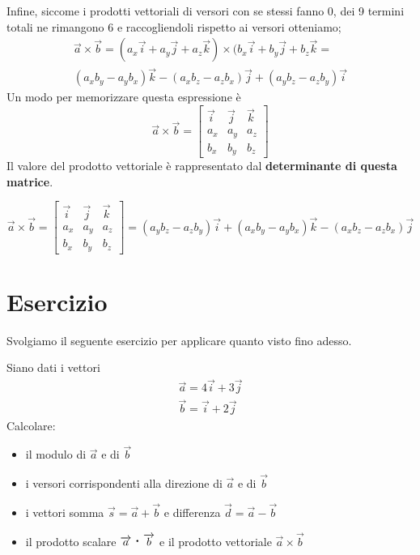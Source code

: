 Infine, siccome i prodotti vettoriali di versori con se stessi fanno 0, dei 9 termini totali ne rimangono 6 e raccogliendoli rispetto ai versori otteniamo;
\begin{align*}
\overrightarrow{a} \times \overrightarrow{b} = ( a_{x} \overrightarrow{i} + a_{y}\overrightarrow{j} + a_{z} \overrightarrow{k}  ) \times ( b_{x} \overrightarrow{i} + b_{y} \overrightarrow{j} + b_{z} \overrightarrow{k} = \\
( a_{x} b_{y} - a_{y} b_{x} ) \overrightarrow{k} - ( a_{x} b_{z} - a_{z} b_{x} ) \overrightarrow{j} + ( a_{y} b_{z} - a_{z} b_{y} ) \overrightarrow{i}
\end{align*}
Un modo per memorizzare questa espressione è
$$ \overrightarrow{a} \times \overrightarrow{b} = \begin{bmatrix}
\overrightarrow{i} & \overrightarrow{j} & \overrightarrow{k} \\
a_{x} & a_{y} & a_{z} \\
b_{x} & b_{y} & b_{z}
\end{bmatrix}  $$
Il valore del prodotto vettoriale è rappresentato dal \textbf{determinante di questa matrice}.

$$ \overrightarrow{a} \times \overrightarrow{b} = \begin{bmatrix}
\overrightarrow{i} & \overrightarrow{j} & \overrightarrow{k} \\
a_{x} & a_{y} & a_{z} \\
b_{x} & b_{y} & b_{z}
\end{bmatrix}  
= ( a_{y} b_{z} - a_{z} b_{y} ) \overrightarrow{i} + ( a_{x} b_{y} - a_{y} b_{x} ) \overrightarrow{k} - ( a_{x} b_{z} - a_{z} b_{x} ) \overrightarrow{j}  $$

\section{Esercizio}
Svolgiamo il seguente esercizio per applicare quanto visto fino adesso.

Siano dati i vettori
\begin{align*}
\overrightarrow{a} = 4 \overrightarrow{i} + 3 \overrightarrow{j} \\
\overrightarrow{b} = \overrightarrow{i} + 2 \overrightarrow{j}
\end{align*}
Calcolare:
\begin{itemize}
\item il modulo di $ \overrightarrow{a} $ e di $ \overrightarrow{b} $
\item i versori corrispondenti alla direzione di $ \overrightarrow{a} $ e di $\overrightarrow{b} $
\item i vettori somma $ \overrightarrow{s} = \overrightarrow{a} + \overrightarrow{b} $ e differenza $ \overrightarrow{d} = \overrightarrow{a} - \overrightarrow{b} $
\item il prodotto scalare $ \overrightarrow{a} \prodscal \overrightarrow{b} $ e il prodotto vettoriale $ \overrightarrow{a} \times \overrightarrow{b} $
\end{itemize}

